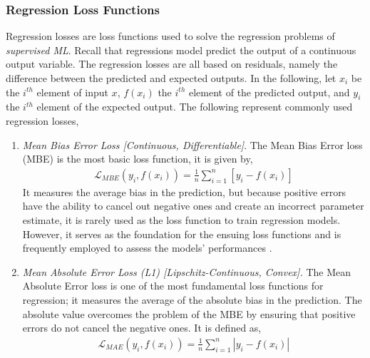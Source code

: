 \documentclass{article}
\begin{document}
  \subsubsection{Regression Loss Functions}%
  \label{sub:Loss Function}
    Regression losses are loss functions used to solve the regression problems of \textit{supervised ML}. Recall that regressions model predict the output of a continuous output variable. The regression losses are all based on residuals, namely the difference between the predicted and expected outputs. In the following, let $x_i$ be the $i^{th}$ element of input $x$, $f(x_i)$ the $i^{th}$ element of the predicted output, and $y_i$ the $i^{th}$ element of the expected output. The following represent commonly used regression losses,
  \begin{enumerate}
    \item \textit{Mean Bias Error Loss [Continuous, Differentiable]}. The Mean Bias Error loss (MBE) is the most basic loss function, it is given by,
    \begin{equation}
      \begin{split}
        \mathcal{L}_{MBE} (y_i, f(x_i))= \frac{1}{n} \sum^{n}_{i=1} [y_i-f(x_i)]
      \end{split}
    \end{equation}
 It measures the average bias in the prediction, but because positive errors have the ability to cancel out negative ones and create an incorrect parameter estimate, it is rarely used as the loss function to train regression models. However, it serves as the foundation for the ensuing loss functions and is frequently employed to assess the models' performances \citep{ciampiconi2023survey}.
    \item \textit{Mean Absolute Error Loss (L1) [Lipschitz-Continuous, Convex].} The Mean Absolute Error loss is one of the most fundamental loss functions for regression; it measures the average of the absolute bias in the prediction. The absolute value overcomes the problem of the MBE by ensuring that positive errors do not cancel the negative ones. It is defined as, 
    \begin{equation}
      \begin{split}
        \mathcal{L}_{MAE}(y_i, f(x_i)) = \frac{1}{n} \sum^{n}_{i=1} |y_i-f(x_i)|
      \end{split}
    \end{equation}


\end{enumerate}
\end{document}
